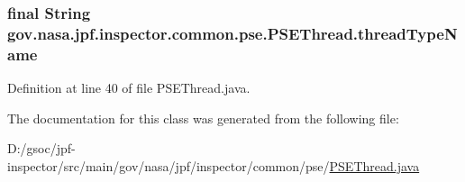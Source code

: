\subsubsection[{\texorpdfstring{thread\+Type\+Name}{threadTypeName}}]{\setlength{\rightskip}{0pt plus 5cm}final String gov.\+nasa.\+jpf.\+inspector.\+common.\+pse.\+P\+S\+E\+Thread.\+thread\+Type\+Name\hspace{0.3cm}{\ttfamily [private]}}\hypertarget{classgov_1_1nasa_1_1jpf_1_1inspector_1_1common_1_1pse_1_1_p_s_e_thread_a6b17e072db94a8a4282a5cc399329e9f}{}\label{classgov_1_1nasa_1_1jpf_1_1inspector_1_1common_1_1pse_1_1_p_s_e_thread_a6b17e072db94a8a4282a5cc399329e9f}


Definition at line 40 of file P\+S\+E\+Thread.\+java.



The documentation for this class was generated from the following file\+:\begin{DoxyCompactItemize}
\item 
D\+:/gsoc/jpf-\/inspector/src/main/gov/nasa/jpf/inspector/common/pse/\hyperlink{_p_s_e_thread_8java}{P\+S\+E\+Thread.\+java}\end{DoxyCompactItemize}
